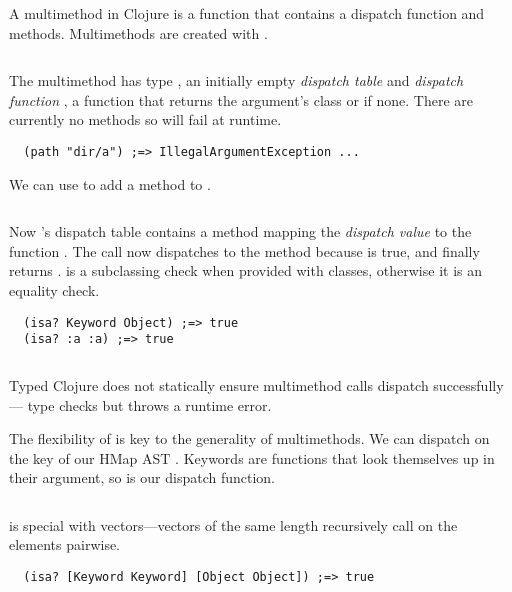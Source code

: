 A multimethod in Clojure is a function that contains a dispatch
function and methods. Multimethods are created with {}.
\inputminted[firstline=5,lastline=7]{clojure}{code/demo/src/demo/rep.clj}
The multimethod  has type , an initially empty \emph{dispatch table}
and \emph{dispatch function} , a function that returns the argument's class or  if none.
There are currently no methods so  will fail at runtime.
\begin{verbatim}
  (path "dir/a") ;=> IllegalArgumentException ...
\end{verbatim}

We can use {} to add a method to .
\inputminted[firstline=8,lastline=8]{clojure}{code/demo/src/demo/rep.clj}
Now 's dispatch table contains a method mapping
the \emph{dispatch value}  to the function
. The call 
now dispatches to the method because
is true, and finally returns .
 is a subclassing check when provided with classes,
otherwise it is an equality check.
\begin{verbatim}
  (isa? Keyword Object) ;=> true
  (isa? :a :a) ;=> true
\end{verbatim}

\begin{exmp}
\inputminted[firstline=5,lastline=11]{clojure}{code/demo/src/demo/rep.clj}
\label{example:rep}
\end{exmp}

Typed Clojure does not statically ensure multimethod calls dispatch successfully--- 
type checks but throws a runtime error.

The flexibility of  is key to the generality of multimethods. 
We can dispatch on the  key 
of our HMap AST .
Keywords are functions that look themselves up in their argument, so 
is our dispatch function.

\begin{exmp}
\inputminted[firstline=5,lastline=25]{clojure}{code/demo/src/demo/eg5.clj}
\end{exmp}

 is special with vectors---vectors of the
same length recursively call  on the elements pairwise.
\begin{verbatim}
  (isa? [Keyword Keyword] [Object Object]) ;=> true
\end{verbatim}

